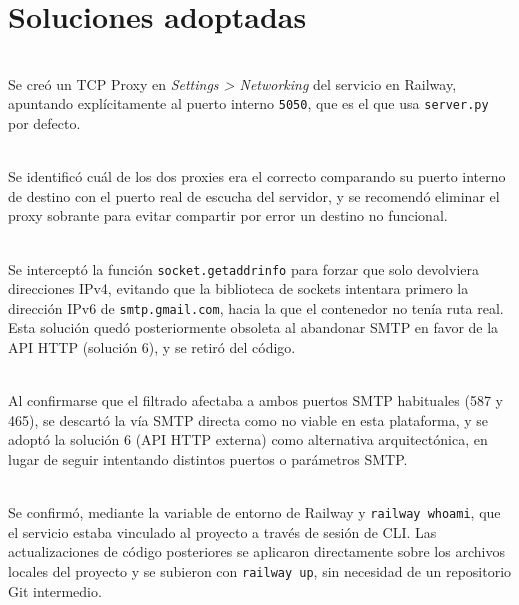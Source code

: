 \documentclass[12pt,a4paper]{article}
\begin{document}
\section{Soluciones adoptadas}

\begin{description}[leftmargin=0cm,style=nextline]
    \item[Solución 1] \hfill \\
    Se creó un TCP Proxy en \textit{Settings > Networking} del servicio en Railway, apuntando explícitamente al puerto interno \texttt{5050}, que es el que usa \texttt{server.py} por defecto.

    \item[Solución 2] \hfill \\
    Se identificó cuál de los dos proxies era el correcto comparando su puerto interno de destino con el puerto real de escucha del servidor, y se recomendó eliminar el proxy sobrante para evitar compartir por error un destino no funcional.

    \item[Solución 3] \hfill \\
    Se interceptó la función \texttt{socket.getaddrinfo} para forzar que solo devolviera direcciones IPv4, evitando que la biblioteca de sockets intentara primero la dirección IPv6 de \texttt{smtp.gmail.com}, hacia la que el contenedor no tenía ruta real. Esta solución quedó posteriormente obsoleta al abandonar SMTP en favor de la API HTTP (solución 6), y se retiró del código.

    \item[Solución 4] \hfill \\
    Al confirmarse que el filtrado afectaba a ambos puertos SMTP habituales (587 y 465), se descartó la vía SMTP directa como no viable en esta plataforma, y se adoptó la solución 6 (API HTTP externa) como alternativa arquitectónica, en lugar de seguir intentando distintos puertos o parámetros SMTP.

    \item[Solución 5] \hfill \\
    Se confirmó, mediante la variable de entorno de Railway y \texttt{railway whoami}, que el servicio estaba vinculado al proyecto a través de sesión de CLI. Las actualizaciones de código posteriores se aplicaron directamente sobre los archivos locales del proyecto y se subieron con \texttt{railway up}, sin necesidad de un repositorio Git intermedio.


\end{description}
\end{document}
